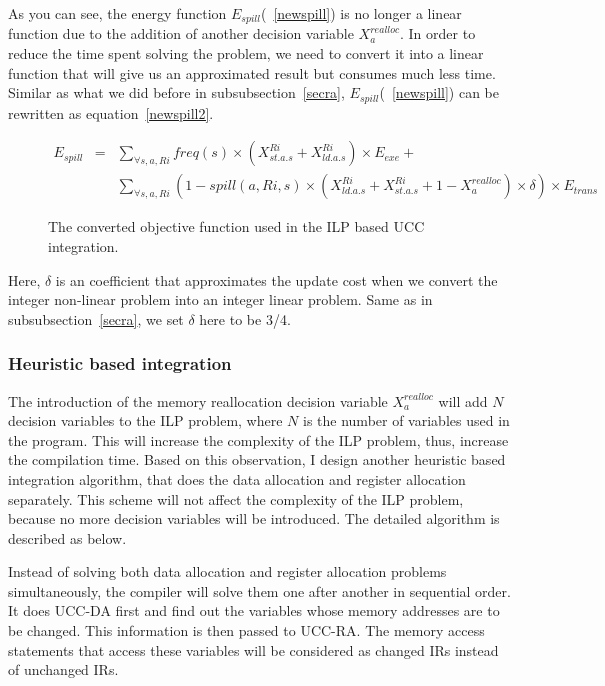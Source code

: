 As you can see, the energy function $E_{spill}$(~\ref{newspill}) is no longer a linear function
due to the addition of another decision variable $X_{a}^{realloc}$.
In order to reduce the time spent solving the problem, we need to convert
it into a linear function that will give us an approximated result but 
consumes much less time.
Similar as what we did before in subsubsection~\ref{secra}, $E_{spill}$(~\ref{newspill})
can be rewritten as equation~\ref{newspill2}.
\begin{figure}[ht]
\begin{small}
\begin{eqnarray}
E_{spill} &=& \sum_{\forall s, a, Ri}
freq(s) \times (X_{st.a.s}^{Ri}+X_{ld.a.s}^{Ri}) \times E_{exe} + \nonumber\\
					& & \sum_{\forall s, a, Ri}(1-spill(a,Ri,s)\times
 (X_{ld.a.s}^{Ri}+X_{st.a.s}^{Ri}+1-X_{a}^{realloc})\times \delta )\times E_{trans} \label{newspill2} 
\end{eqnarray}
\end{small}
\caption{The converted objective function used in the ILP based UCC integration.}
\label{newObj2}
\end{figure}

Here, $\delta$ is an coefficient that approximates the update cost when we 
convert the integer non-linear problem into an integer linear problem.
Same as in subsubsection~\ref{secra}, we set $\delta$ here to be 3/4.


\subsubsection{Heuristic based integration}

The introduction of the memory reallocation decision variable $X_{a}^{realloc}$ will add $N$ 
decision variables to the ILP problem, where $N$ is the number of variables used in the
program. This will increase the complexity of the ILP problem, thus, increase the
compilation time.
Based on this observation, I design another heuristic based integration algorithm, that
does the data allocation and register allocation separately. This scheme will not
affect the complexity of the ILP problem, because no more decision variables will be introduced.
The detailed algorithm is described as below.

Instead of solving both data allocation and register allocation problems simultaneously, 
the compiler will solve them one after another in sequential order. It does UCC-DA first and find out the variables whose 
memory addresses are to be changed. This information is then passed to UCC-RA. The memory access statements that
access these variables will be considered as changed IRs instead of unchanged IRs.

